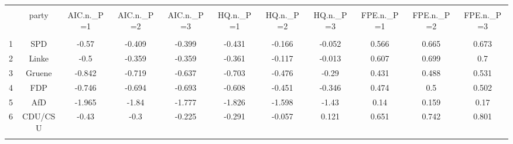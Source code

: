 
\begin{table}[!htbp] \centering 
  \caption{} 
  \label{} 
\begin{tabular}{@{\extracolsep{5pt}} ccccccccccc} 
\\[-1.8ex]\hline 
\hline \\[-1.8ex] 
 & party & AIC.n.\_P=1 & AIC.n.\_P=2 & AIC.n.\_P=3 & HQ.n.\_P=1 & HQ.n.\_P=2 & HQ.n.\_P=3 & FPE.n.\_P=1 & FPE.n.\_P=2 & FPE.n.\_P=3 \\ 
\hline \\[-1.8ex] 
1 & SPD & -0.57 & -0.409 & -0.399 & -0.431 & -0.166 & -0.052 & 0.566 & 0.665 & 0.673 \\ 
2 & Linke & -0.5 & -0.359 & -0.359 & -0.361 & -0.117 & -0.013 & 0.607 & 0.699 & 0.7 \\ 
3 & Gruene & -0.842 & -0.719 & -0.637 & -0.703 & -0.476 & -0.29 & 0.431 & 0.488 & 0.531 \\ 
4 & FDP & -0.746 & -0.694 & -0.693 & -0.608 & -0.451 & -0.346 & 0.474 & 0.5 & 0.502 \\ 
5 & AfD & -1.965 & -1.84 & -1.777 & -1.826 & -1.598 & -1.43 & 0.14 & 0.159 & 0.17 \\ 
6 & CDU/CSU & -0.43 & -0.3 & -0.225 & -0.291 & -0.057 & 0.121 & 0.651 & 0.742 & 0.801 \\ 
\hline \\[-1.8ex] 
\end{tabular} 
\end{table}  
